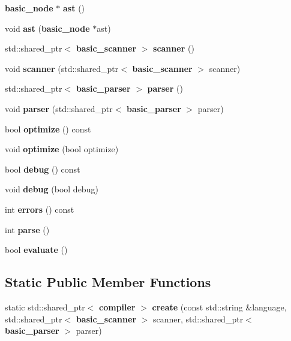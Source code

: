 \begin{DoxyCompactItemize}
\item 
{\bf basic\+\_\+node} $\ast$ {\bfseries ast} ()\label{classcdk_1_1compiler_ae95606d4deb9e5be056685b1f634d10f}

\item 
void {\bfseries ast} ({\bf basic\+\_\+node} $\ast$ast)\label{classcdk_1_1compiler_a841837c96b96d9c59532e57982011dc0}

\item 
std\+::shared\+\_\+ptr$<$ {\bf basic\+\_\+scanner} $>$ {\bfseries scanner} ()\label{classcdk_1_1compiler_abc44fb2cd388b0c4f76e0797e0972ecf}

\item 
void {\bfseries scanner} (std\+::shared\+\_\+ptr$<$ {\bf basic\+\_\+scanner} $>$ scanner)\label{classcdk_1_1compiler_a4ee8a64e131f0fd1d179e8be8d88e654}

\item 
std\+::shared\+\_\+ptr$<$ {\bf basic\+\_\+parser} $>$ {\bfseries parser} ()\label{classcdk_1_1compiler_a701f3411ada26d678b133134f492e6dd}

\item 
void {\bfseries parser} (std\+::shared\+\_\+ptr$<$ {\bf basic\+\_\+parser} $>$ parser)\label{classcdk_1_1compiler_a52a6e6b5cfa7361ceb0372ef6b4a9f73}

\item 
bool {\bfseries optimize} () const \label{classcdk_1_1compiler_a0fae7c4f7f79d9fc48fbdfc872a75f73}

\item 
void {\bfseries optimize} (bool optimize)\label{classcdk_1_1compiler_afd34aede83f1a60e8f2685b7a9e31ffe}

\item 
bool {\bfseries debug} () const \label{classcdk_1_1compiler_a3b619e3c4583fe01ba1befc783908ad2}

\item 
void {\bfseries debug} (bool debug)\label{classcdk_1_1compiler_a672a0cd7f68b61956fdbd541b21445a1}

\item 
int {\bfseries errors} () const \label{classcdk_1_1compiler_a29b5ea1436004c2b14789091b96969db}

\item 
int {\bfseries parse} ()\label{classcdk_1_1compiler_a1f39738f2142ebdabfc2122b635fa9d7}

\item 
bool {\bf evaluate} ()
\end{DoxyCompactItemize}
\subsection*{Static Public Member Functions}
\begin{DoxyCompactItemize}
\item 
static std\+::shared\+\_\+ptr$<$ {\bf compiler} $>$ {\bfseries create} (const std\+::string \&language, std\+::shared\+\_\+ptr$<$ {\bf basic\+\_\+scanner} $>$ scanner, std\+::shared\+\_\+ptr$<$ {\bf basic\+\_\+parser} $>$ parser)\label{classcdk_1_1compiler_a0e14073a550646ab3ffeb20ec2c31691}

\end{DoxyCompactItemize}
